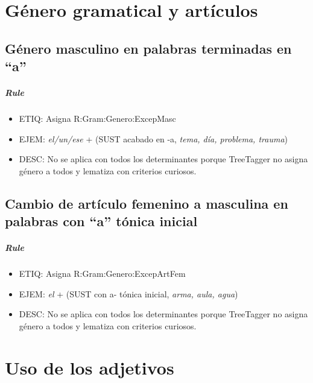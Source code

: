 \documentclass[11pt]{report}
\begin{document}
\chapter{Género gramatical y artículos}
\section{Género masculino en palabras terminadas en ``a''}
\paragraph*{Rule}
\begin{itemize}
\item ETIQ: Asigna R:Gram:Genero:ExcepMasc
\item EJEM: \emph{el/un/ese} + (SUST acabado en -a, \emph{tema, día, problema, trauma})
\item DESC: No se aplica con todos los determinantes porque TreeTagger no asigna género a todos y lematiza con criterios curiosos.
\end{itemize}

\section{Cambio de artículo femenino a masculina en palabras con ``a'' tónica inicial}
\paragraph*{Rule}
\begin{itemize}
\item ETIQ: Asigna R:Gram:Genero:ExcepArtFem
\item EJEM: \emph{el} + (SUST con a- tónica inicial, \emph{arma, aula, agua})
\item DESC: No se aplica con todos los determinantes porque TreeTagger no asigna género a todos y lematiza con criterios curiosos.
\end{itemize}

\chapter{Uso de los adjetivos}
\end{document}

